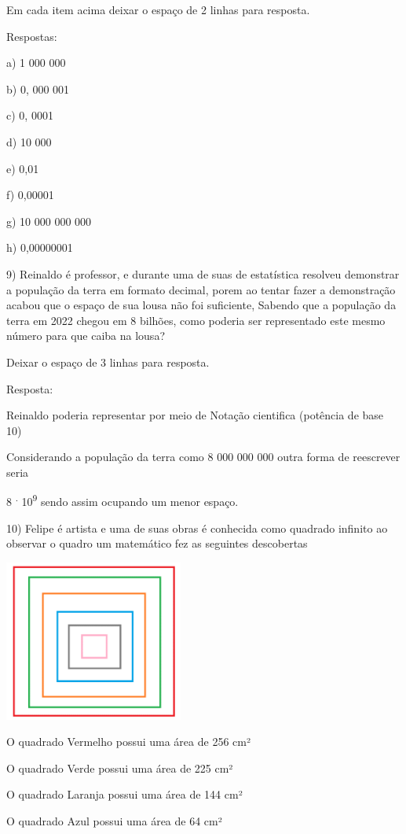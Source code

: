 Em cada item acima deixar o espaço de 2 linhas para resposta.

Respostas:

a) 1 000 000

b) 0, 000 001

c) 0, 0001

d) 10 000

e) 0,01

f) 0,00001

g) 10 000 000 000

h) 0,00000001

9) Reinaldo é professor, e durante uma de suas de estatística resolveu
demonstrar a população da terra em formato decimal, porem ao tentar
fazer a demonstração acabou que o espaço de sua lousa não foi
suficiente, Sabendo que a população da terra em 2022 chegou em 8
bilhões, como poderia ser representado este mesmo número para que caiba
na lousa?

Deixar o espaço de 3 linhas para resposta.

Resposta:

Reinaldo poderia representar por meio de Notação cientifica (potência de
base 10)

Considerando a população da terra como 8 000 000 000 outra forma de
reescrever seria

8 \textsuperscript{.} 10\textsuperscript{9} sendo assim ocupando um
menor espaço.

10) Felipe é artista e uma de suas obras é conhecida como quadrado
infinito ao observar o quadro um matemático fez as seguintes descobertas

\includegraphics[width=2.3125in,height=2.07917in]{./imgSAEB_8_MAT/media/image2.png}

O quadrado Vermelho possui uma área de 256 cm²

O quadrado Verde possui uma área de 225 cm²

O quadrado Laranja possui uma área de 144 cm²

O quadrado Azul possui uma área de 64 cm²

